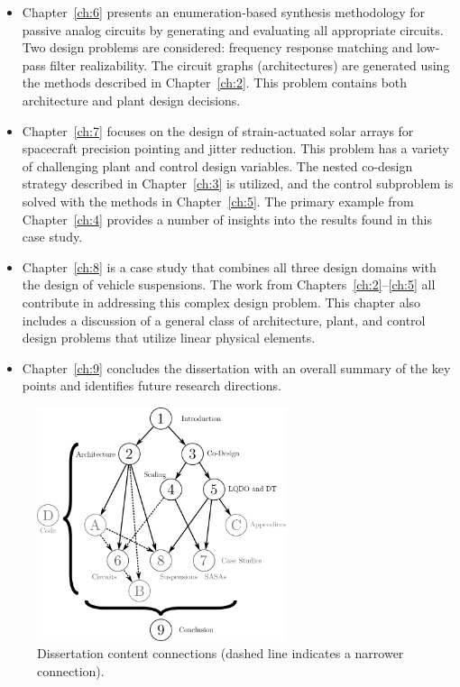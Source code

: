 \begin{itemize}
\item Chapter~\ref{ch:6} presents an enumeration-based synthesis methodology for passive analog circuits by generating and evaluating all appropriate circuits.
Two design problems are considered: frequency response matching and low-pass filter realizability.
The circuit graphs (architectures) are generated using the methods described in Chapter~\ref{ch:2}.
This problem contains both architecture and plant design decisions.

\item Chapter~\ref{ch:7} focuses on the design of strain-actuated solar arrays for spacecraft precision pointing and jitter reduction.
This problem has a variety of challenging plant and control design variables.
The nested co-design strategy described in Chapter~\ref{ch:3} is utilized, and the control subproblem is solved with the methods in Chapter~\ref{ch:5}.
The primary example from Chapter~\ref{ch:4} provides a number of insights into the results found in this case study.

\item Chapter~\ref{ch:8} is a case study that combines all three design domains with the design of vehicle suspensions.
The work from Chapters~\ref{ch:2}--\ref{ch:5} all contribute in addressing this complex design problem.
This chapter also includes a discussion of a general class of architecture, plant, and control design problems that utilize linear physical elements.

\item Chapter~\ref{ch:9} concludes the dissertation with an overall summary of the key points and identifies future research directions.

\end{itemize}

\begin{figure}[hb]
\centering
\includegraphics[width=0.65\textwidth]{../ch1/figures/outline2.pdf}
\caption[Dissertation content connections]{Dissertation content connections (dashed line indicates a narrower connection).\label{fig:ch1:outline}}
\end{figure}